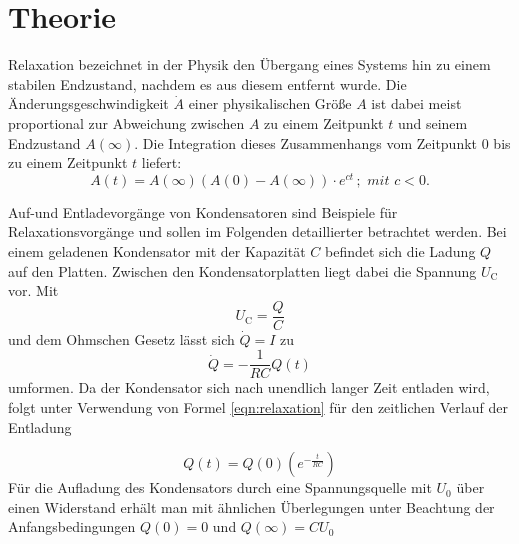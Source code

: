 \section{Theorie}
\label{sec:Theorie}
Relaxation bezeichnet in der Physik den Übergang eines Systems hin zu einem stabilen Endzustand, nachdem es aus diesem entfernt wurde.
Die Änderungsgeschwindigkeit $\dot{A}$ einer physikalischen Größe $A$ ist dabei meist proportional zur Abweichung zwischen $A$ zu einem Zeitpunkt $t$ und seinem Endzustand $A(\infty)$.
Die Integration dieses Zusammenhangs vom Zeitpunkt $0$ bis zu einem Zeitpunkt $t$ liefert:
\begin{equation}
  \label{eqn:relaxation}
  A(t)=A(\infty) (  A(0)-A(\infty) ) \cdot e^{ct}\, ;\,\, mit\,\, c<0 .
\end{equation}

Auf-und Entladevorgänge von Kondensatoren sind Beispiele für Relaxationsvorgänge und sollen im Folgenden detaillierter betrachtet werden.
Bei einem geladenen Kondensator mit der Kapazität $C$ befindet sich die Ladung $Q$ auf den Platten.
Zwischen den Kondensatorplatten liegt dabei die Spannung $U_\text{C}$ vor. Mit
\begin{equation*}
  U_\text{C}=\frac{Q}{C}
\end{equation*}
und dem Ohmschen Gesetz lässt sich $\dot{Q}=I$ zu
\begin{equation}
\dot{Q}=-\frac{1}{RC}Q(t)
\end{equation}
umformen.
Da der Kondensator sich nach unendlich langer Zeit entladen wird, folgt unter Verwendung von Formel \eqref{eqn:relaxation} für den zeitlichen Verlauf der Entladung

\begin{equation}
  \label{eqn:aufladung}
  Q(t)=Q(0)(e^{-\frac{t}{RC}})
\end{equation}
Für die Aufladung des Kondensators durch eine Spannungsquelle mit $U_0$ über einen Widerstand erhält man mit ähnlichen Überlegungen unter Beachtung der Anfangsbedingungen $Q(0)=0$ und $Q(\infty)=CU_\text{0}$

